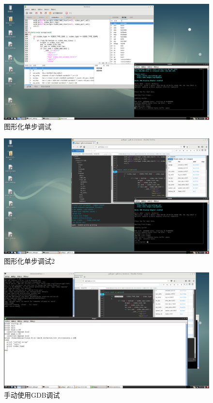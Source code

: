 \documentclass[]{report}
\begin{document}
\begin{figure}
    \centering
    \includegraphics[width=1\linewidth]{img/1}
    \caption[图形化单步调试]{图形化单步调试}
    \label{fig:1}
\end{figure}
\begin{figure}
    \centering
    \includegraphics[width=1\linewidth]{img/2}
    \caption[图形化单步调试2]{图形化单步调试2}
    \label{fig:2}
\end{figure}
\begin{figure}
    \centering
    \includegraphics[width=1\linewidth]{img/3}
    \caption[手动使用GDB调试]{手动使用GDB调试}
    \label{fig:3}
\end{figure}
\end{document}
